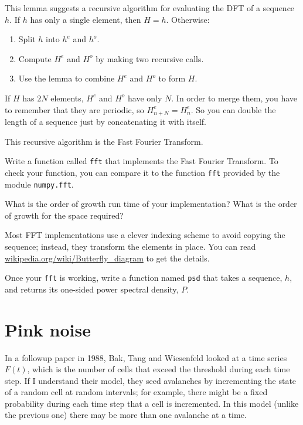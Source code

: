 \documentclass[10pt]{book}
\begin{document}
This lemma suggests a recursive algorithm for evaluating the DFT
of a sequence $h$.  If  $h$ has only a single element, then $H=h$.
Otherwise:

\begin{enumerate}

\item Split $h$ into $h^e$ and $h^o$.

\item Compute $H^e$ and $H^o$ by making two recursive calls.

\item Use the lemma to combine $H^e$ and $H^o$ to form $H$.

\end{enumerate}

If $H$ has $2N$ elements, $H^e$ and $H^o$ have only $N$.
In order to merge them, you have to remember that they are
periodic, so $H^e_{n+N} = H^e_{n}$.  So you can double the
length of a sequence just by concatenating it with itself.

This recursive algorithm is the Fast Fourier Transform.

\begin{ex}

Write a function called {\tt fft} that implements
the Fast Fourier Transform.  To check your function, you
can compare it to the function {\tt fft} provided by
the module {\tt numpy.fft}.

What is the order of growth run time of your implementation?
What is the order of growth for the space required?

\end{ex}

Most FFT implementations use a clever indexing scheme to avoid copying
the sequence; instead, they transform the elements in place.  You can
read \url{wikipedia.org/wiki/Butterfly_diagram} to get the details.

\begin{ex}

Once your {\tt fft} is working, write a function named
{\tt psd} that takes a sequence, $h$, and returns its
one-sided power spectral density, $P$.

\end{ex}


\section{Pink noise}

In a followup paper in 1988, Bak, Tang and Wiesenfeld looked
at a time series $F(t)$, which is the number of cells that
exceed the threshold during each time step.  If I understand
their model, they seed avalanches by incrementing the state
of a random cell at random intervals; for example, there might
be a fixed probability during each time step that a cell
is incremented.  In this model (unlike the previous one) there
may be more than one avalanche at a time.
\end{document}
